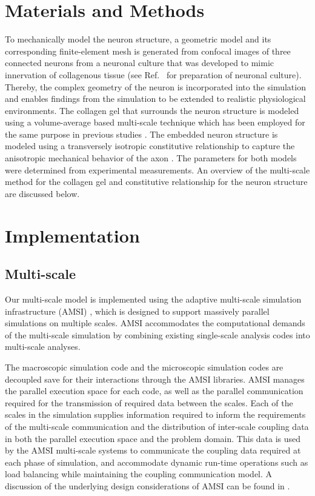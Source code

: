 \documentclass[]{interact}
\begin{document}
\section{Materials and Methods}
\label{sec:materials_and_methods}
To mechanically model the neuron structure, a geometric model and its corresponding finite-element mesh is generated from confocal images of three connected neurons from a neuronal culture that was developed to mimic innervation of collagenous tissue (see Ref.\  for preparation of neuronal culture). Thereby, the complex geometry of the neuron is incorporated into the simulation and enables findings from the simulation to be extended to realistic physiological environments. The collagen gel that surrounds the neuron structure is modeled using a volume-average based multi-scale technique which has been employed for the same purpose in previous studies \citep{Chandran:2007hy,Stylianopoulos:2007dp,Barocas:2007gk,Lai:2012ji,Lake:2012jm}. The embedded neuron structure is modeled using a transversely isotropic constitutive relationship to capture the anisotropic mechanical behavior of the axon \citep{Peter:2012fc}. The parameters for both models were determined from experimental measurements. An overview of the multi-scale method for the collagen gel and constitutive relationship for the neuron structure are discussed below.

\section{Implementation}
\label{sec:implementation}

\subsection{Multi-scale}
Our multi-scale model is implemented using the adaptive multi-scale simulation infrastructure (AMSI) \citep{Tobin:2017ip}, which is designed to support massively parallel simulations on multiple scales. AMSI accommodates the computational demands of the multi-scale simulation by combining existing single-scale analysis codes into multi-scale analyses.

The macroscopic simulation code and the microscopic simulation codes are decoupled save for their interactions through the AMSI libraries. AMSI manages the parallel execution space for each code, as well as the parallel communication required for the transmission of required data between the scales. Each of the scales in the simulation supplies information required to inform the requirements of the multi-scale communication and the distribution of inter-scale coupling data in both the parallel execution space and the problem domain. This data is used by the AMSI multi-scale systems to communicate the coupling data required at each phase of simulation, and accommodate dynamic run-time operations such as load balancing while maintaining the coupling communication model. A discussion of the underlying design considerations of AMSI can be found in \citep{Delalondre:2010kt}.
\end{document}
